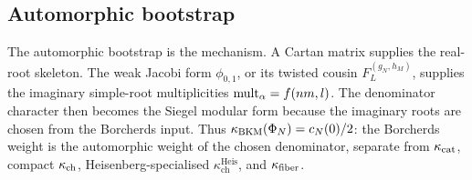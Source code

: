 \subsection{Automorphic bootstrap}
\label{subsec:most-load-bearing}

The automorphic bootstrap is the mechanism. A Cartan matrix supplies the
real-root skeleton. The weak Jacobi form $\phi_{0,1}$, or its twisted
cousin $F_L^{(g_N,h_M)}$, supplies the imaginary simple-root
multiplicities $\operatorname{mult}_\alpha=f(nm,l)$. The denominator character then
becomes the Siegel modular form because the imaginary roots are chosen
from the Borcherds input. Thus $\kappa_{\mathrm{BKM}}(\Phi_N)=c_N(0)/2$: the
Borcherds weight is the automorphic weight of the chosen denominator,
separate from $\kappa_{\mathrm{cat}}$, compact $\kappa_{\mathrm{ch}}$, Heisenberg-specialised
$\kappa_{\mathrm{ch}}^{\mathrm{Heis}}$, and $\kappa_{\mathrm{fiber}}$.
